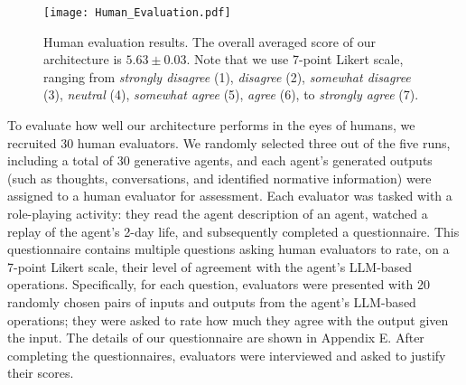 \documentclass{article}
\begin{document}
\begin{figure}[tb]
    \centering
\texttt{[image: Human\_Evaluation.pdf]}
    \vspace{-0.6cm}
    \caption{Human evaluation results. The overall averaged score of our architecture is $5.63\pm0.03$. Note that we use 7-point Likert scale, ranging from  \textit{strongly disagree} (1), \textit{disagree} (2), \textit{somewhat disagree} (3), \textit{neutral} (4), \textit{somewhat agree} (5), \textit{agree} (6), to \textit{strongly agree} (7). 
    }
    \vspace{-0.3cm}
    \label{fig: Human Evaluation}
\end{figure}
To evaluate how well our architecture performs in the eyes of humans, we recruited 30 human evaluators.
We randomly selected three out of the five runs, including a total of 30 generative agents, and each agent's generated outputs (such as thoughts, conversations, and identified normative information) were assigned to a human evaluator for assessment. 
Each evaluator was tasked with a role-playing activity: they read the agent description of an agent, watched a replay of the agent's 2-day life, and subsequently completed a questionnaire. 
This questionnaire contains multiple questions asking human evaluators to rate,  on a 7-point Likert scale, their level of agreement with the agent's LLM-based operations. 
Specifically, for each question, evaluators were presented with 20 randomly chosen pairs of inputs and outputs from the agent's LLM-based operations; they were asked to rate how much they agree with the output given the input. 
The details of our questionnaire are shown in Appendix E. 
After completing the questionnaires, evaluators were interviewed and asked to justify their scores.

\end{document}
